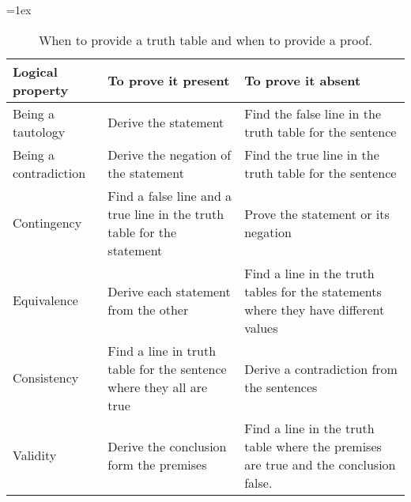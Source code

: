 \begin{table}
\tabulinesep=1ex
\begin{mdframed}[style=mytablebox]
\begin{tabu}{X[.5,c,m] ||X[1,l,m] |X[1,l,m]}
\bf{Logical property} 	&	\bf{To prove it present} 	&	\bf{To prove it absent} \\ \hline \hline
Being a tautology 		& Derive the statement  						& Find the false line in the truth table for the sentence \\ \hline
Being a contradiction 	&  Derive the negation of the statement  		 & Find the true line in the truth table for the sentence\\ \hline
Contingency 			& Find a false line and a true line in the truth table for the statement & Prove the statement or its negation\\ \hline
Equivalence 			& Derive each statement from the other 		 & Find a line in the truth tables for the statements where they have different values\\ \hline
Consistency 		& Find a line in truth table for the sentence where they all are true & Derive a contradiction from the sentences\\ \hline
Validity 				& Derive the conclusion form the premises & Find a line in the truth table where the premises are true and the conclusion false. \\ 
\end{tabu}
\end{mdframed}
\caption{When to provide a truth table and when to provide a proof.}
\label{table.ProofOrModel}
\end{table}



